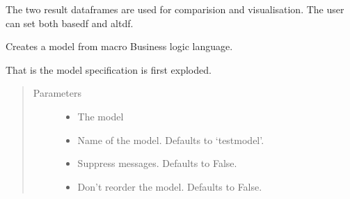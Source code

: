 \documentclass[letterpaper,10pt,english]{sphinxmanual}
\begin{document}
\begin{fulllineitems}
\sphinxAtStartPar
The two result dataframes are used for comparision and visualisation. The user can set both basedf and altdf.

\begin{fulllineitems}
\label{\detokenize{index:modelclass.BaseModel.from_eq}}
\pysigstartsignatures
{}
\pysigstopsignatures
\sphinxAtStartPar
Creates a model from macro Business logic language.

\sphinxAtStartPar
That is the model specification is first exploded.
\begin{quote}\begin{description}
\item[{Parameters}] \leavevmode\begin{itemize}
\item {} 
\sphinxAtStartPar
{} \textendash{} The model

\item {} 
\sphinxAtStartPar
{} \textendash{} Name of the model. Defaults to ‘testmodel’.

\item {} 
\sphinxAtStartPar
{} \textendash{} Suppress messages. Defaults to False.

\item {} 
\sphinxAtStartPar
{} \textendash{} Don’t reorder the model. Defaults to False.


\end{itemize}
\end{description}
\end{quote}
\end{fulllineitems}
\end{fulllineitems}
\end{document}
